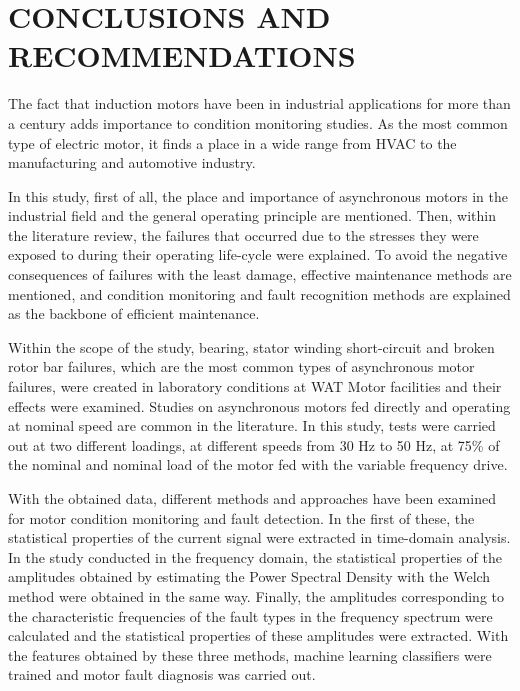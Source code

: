 \chapter{CONCLUSIONS AND RECOMMENDATIONS}\label{Ch5}

The fact that induction motors have been in industrial applications for more than a century adds importance to condition monitoring studies. As the most common type of electric motor, it finds a place in a wide range from HVAC to the manufacturing and automotive industry.

In this study, first of all, the place and importance of asynchronous motors in the industrial field and the general operating principle are mentioned. Then, within the literature review, the failures that occurred due to the stresses they were exposed to during their operating life-cycle were explained. To avoid the negative consequences of failures with the least damage, effective maintenance methods are mentioned, and condition monitoring and fault recognition methods are explained as the backbone of efficient maintenance.

Within the scope of the study, bearing, stator winding short-circuit and broken rotor bar failures, which are the most common types of asynchronous motor failures, were created in laboratory conditions at WAT Motor facilities and their effects were examined. Studies on asynchronous motors fed directly and operating at nominal speed are common in the literature. In this study, tests were carried out at two different loadings, at different speeds from 30 Hz to 50 Hz, at 75\% of the nominal and nominal load of the motor fed with the variable frequency drive.

With the obtained data, different methods and approaches have been examined for motor condition monitoring and fault detection. In the first of these, the statistical properties of the current signal were extracted in time-domain analysis. In the study conducted in the frequency domain, the statistical properties of the amplitudes obtained by estimating the Power Spectral Density with the Welch method were obtained in the same way. Finally, the amplitudes corresponding to the characteristic frequencies of the fault types in the frequency spectrum were calculated and the statistical properties of these amplitudes were extracted. With the features obtained by these three methods, machine learning classifiers were trained and motor fault diagnosis was carried out.


